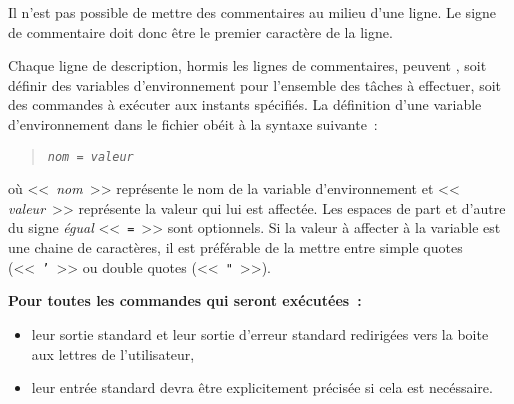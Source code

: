 \begin{remarque}
Il n'est pas possible de mettre des commentaires au milieu d'une ligne. Le signe de
commentaire doit donc {\^e}tre le premier caract{\`e}re de la ligne.
\end{remarque}

Chaque ligne de description, hormis les lignes de commentaires, peuvent , soit
d{\'e}finir des variables d'environnement pour l'ensemble des t{\^a}ches {\`a} effectuer,
soit des commandes {\`a} ex{\'e}cuter aux instants sp{\'e}cifi{\'e}s. La d{\'e}finition d'une
variable d'environnement dans le fichier ob{\'e}it {\`a} la syntaxe suivante~:
\begin{quote}
{\tt {\sl nom} = {\sl valeur}}
\end{quote}
o{\`u} <<~{\sl nom}~>> repr{\'e}sente le nom de la variable d'environnement et <<~{\sl
valeur}~>> repr{\'e}sente la valeur qui lui est affect{\'e}e. Les espaces de part et
d'autre du signe {\sl {\'e}gual} <<~{\tt =}~>> sont optionnels. Si la valeur {\`a}
affecter {\`a} la variable est une chaine de caract{\`e}res, il est pr{\'e}f{\'e}rable de la
mettre entre simple quotes (<<~{\tt '}~>> ou double quotes (<<~\verb="=~>>).

{\bf Pour toutes les commandes qui seront ex{\'e}cut{\'e}es~:
\begin{itemize}
	\item	leur sortie standard et leur sortie d'erreur standard redirig{\'e}es vers
			la boite aux lettres de l'utilisateur,
	\item	leur entr{\'e}e standard devra {\^e}tre explicitement pr{\'e}cis{\'e}e si cela est
			nec{\'e}ssaire.
\end{itemize}
}


